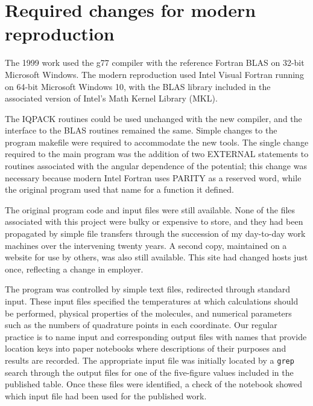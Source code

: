 \section{Required changes for modern reproduction}
The 1999 work used the g77 compiler with the reference Fortran BLAS on 32-bit Microsoft Windows.  The modern reproduction used Intel Visual Fortran running on 64-bit Microsoft Windows 10, with the BLAS library included in the associated version of Intel's Math Kernel Library (MKL).

The IQPACK routines could be used unchanged with the new compiler, and the interface to the BLAS routines remained the same.  Simple changes to the program makefile were required to accommodate the new tools.  The single change required to the main program was the addition of two EXTERNAL statements to routines associated with the angular dependence of the potential; this change was necessary because modern Intel Fortran uses PARITY as a reserved word, while the original program used that name for a function it defined.

The original program code and input files were still available.  None of the files associated with this project were bulky or expensive to store, and they had been propagated by simple file transfers through the succession of my day-to-day work machines over the intervening twenty years.  A second copy, maintained on a website for use by others, was also still available. This site had changed hosts just once, reflecting a change in employer.

The program was controlled by simple text files, redirected through standard input.  These input files specified the temperatures at which calculations should be performed, physical properties of the molecules, and numerical parameters such as the numbers of quadrature points in each coordinate.  Our regular practice is to name input and corresponding output files with names that provide location keys into paper notebooks where descriptions of their purposes and results are recorded.  The appropriate input file was initially located by a \texttt{grep} search through the output files for one of the five-figure values included in the published table.  Once these files were identified, a check of the notebook showed which input file had been used for the published work.



